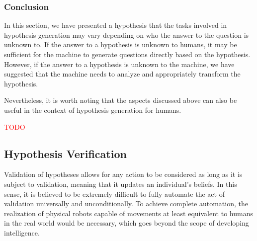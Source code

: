 \documentclass{book}
\begin{document}

\subsubsection{Conclusion}
In this section, we have presented a hypothesis that the tasks involved in hypothesis generation may vary depending on who the answer to the question is unknown to. If the answer to a hypothesis is unknown to humans, it may be sufficient for the machine to generate questions directly based on the hypothesis. However, if the answer to a hypothesis is unknown to the machine, we have suggested that the machine needs to analyze and appropriately transform the hypothesis.

Nevertheless, it is worth noting that the aspects discussed above can also be useful in the context of hypothesis generation for humans.

\textcolor{red}{TODO}

\subsection{Hypothesis Verification}
Validation of hypotheses allows for any action to be considered as long as it is subject to validation, meaning that it updates an individual's beliefs. In this sense, it is believed to be extremely difficult to fully automate the act of validation universally and unconditionally. To achieve complete automation, the realization of physical robots capable of movements at least equivalent to humans in the real world would be necessary, which goes beyond the scope of developing intelligence.
\end{document}
